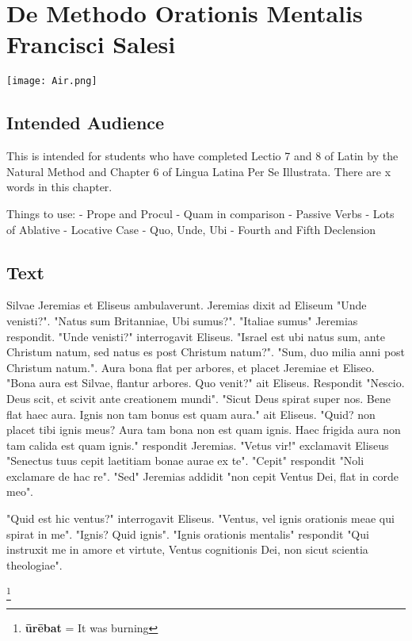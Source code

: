 \chapter{De Methodo Orationis Mentalis Francisci Salesi}
\begin{center}
\texttt{[image: Air.png]}
\end{center}

\section{Intended Audience}
This is intended for students who have completed Lectio 7 and 8 of Latin by the Natural Method and Chapter 6 of Lingua Latina Per Se Illustrata. There are x words in this chapter.

Things to use:
	- Prope and Procul
	- Quam in comparison
	- Passive Verbs
	- Lots of Ablative
	- Locative Case 
	- Quo, Unde, Ubi
	- Fourth and Fifth Declension

\section{Text}
Silvae Jeremias et Eliseus ambulaverunt. Jeremias dixit ad Eliseum "Unde venisti?". "Natus sum Britanniae, Ubi sumus?". "Italiae sumus" Jeremias respondit. "Unde venisti?" interrogavit Eliseus. "Israel est ubi natus sum, ante Christum natum, sed natus es post Christum natum?". "Sum, duo milia anni post Christum natum.". Aura bona flat per arbores, et placet Jeremiae et Eliseo. "Bona aura est Silvae, flantur arbores.  Quo venit?" ait Eliseus. Respondit "Nescio. Deus scit, et scivit ante creationem mundi". "Sicut Deus spirat super nos.  Bene flat haec aura. Ignis non tam bonus est quam aura." ait Eliseus. "Quid? non placet tibi ignis meus? Aura tam bona non est quam ignis. Haec frigida aura non tam calida est quam ignis." respondit Jeremias. "Vetus vir!" exclamavit Eliseus "Senectus tuus cepit laetitiam bonae aurae ex te". "Cepit" respondit "Noli exclamare de hac re". "Sed" Jeremias addidit "non cepit Ventus Dei, flat in corde meo". 

"Quid est hic ventus?" interrogavit Eliseus. "Ventus, vel ignis orationis meae qui spirat in me". "Ignis? Quid ignis". "Ignis orationis mentalis" respondit "Qui instruxit me in amore et virtute, Ventus cognitionis Dei, non sicut scientia theologiae".  

\footnote{\textbf{ūrēbat} = It was burning}